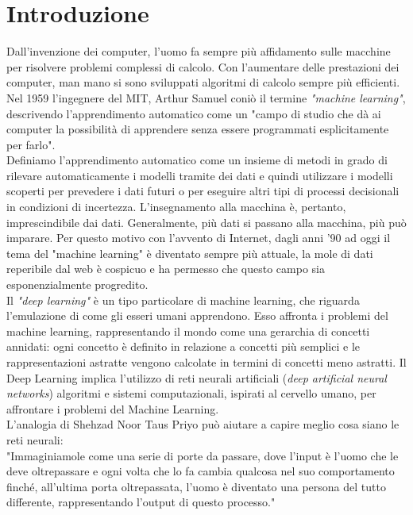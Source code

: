 \documentclass[a4paper,12pt,oneside]{book}
\begin{document}
\section*{Introduzione}
Dall'invenzione dei computer, l'uomo fa sempre pi\`{u} affidamento sulle macchine per risolvere problemi complessi di calcolo. Con l'aumentare delle prestazioni dei computer, man mano si sono sviluppati algoritmi di calcolo sempre pi\`{u} efficienti.
Nel 1959 l'ingegnere del MIT, Arthur Samuel coni\`{o} il termine \textit{"machine learning"}, descrivendo l'apprendimento automatico come un "campo di studio che d\`{a} ai computer la possibilit\`{a} di apprendere senza essere programmati esplicitamente per farlo".\cite{Samuel} \\
Definiamo l'apprendimento automatico come un insieme di metodi in grado di rilevare automaticamente i modelli tramite dei dati e quindi utilizzare i modelli scoperti per prevedere i dati futuri o per eseguire altri tipi di processi decisionali in condizioni di incertezza. L'insegnamento alla macchina \`e, pertanto, imprescindibile dai dati. Generalmente, pi\`{u} dati si passano alla macchina, pi\`{u} pu\`{o} imparare. Per questo motivo con l'avvento di Internet, dagli anni '90 ad oggi il tema del "machine learning" \`e diventato sempre pi\`{u} attuale, la mole di dati reperibile dal web \`e cospicuo e ha permesso che questo campo sia esponenzialmente progredito.\\
Il \textit{"deep learning"} \`e un tipo particolare di machine learning, che riguarda l'emulazione di come gli esseri umani apprendono. Esso affronta i problemi del machine learning, rappresentando il mondo come una gerarchia di concetti annidati: ogni concetto \`e definito in relazione a concetti pi\`{u} semplici e le rappresentazioni astratte vengono calcolate in termini di concetti meno astratti. Il Deep Learning implica l'utilizzo di reti neurali artificiali (\textit{deep artificial neural networks}) algoritmi e sistemi computazionali, ispirati al cervello umano, per affrontare i problemi del Machine Learning.\\
L'analogia di Shehzad Noor Taus Priyo pu\`{o} aiutare a capire meglio cosa siano le reti neurali:\\
"Immaginiamole come una serie di porte da passare, dove l'input \`e l'uomo che le deve oltrepassare e ogni volta che lo fa cambia qualcosa nel suo comportamento finch\'{e}, all'ultima porta oltrepassata, l'uomo \`e diventato una persona del tutto differente, rappresentando l'output di questo processo."\cite{analogia} \\
\end{document}
